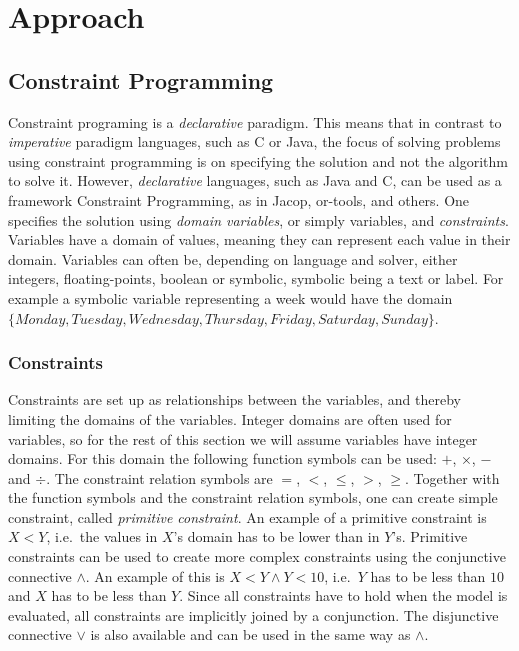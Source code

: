 \chapter{Approach}\label{cha:approach}

\section{Constraint Programming}
Constraint programing is a \emph{declarative} paradigm. This means that in contrast to \emph{imperative} paradigm languages, such as C or Java, the focus of solving problems using constraint programming is on specifying the solution and not the algorithm to solve it. However, \emph{declarative} languages, such as Java and C, can be used as a framework Constraint Programming, as in Jacop, or-tools, and others. One specifies the solution using \emph{domain variables}, or simply variables, and \emph{constraints}. Variables have a domain of values, meaning they can represent each value in their domain. Variables can often be, depending on language and solver, either integers, floating-points, boolean or symbolic, symbolic being a text or label. For example a symbolic variable representing a week would have the domain\\
$\{Monday,Tuesday, Wednesday, Thursday, Friday, Saturday, Sunday\}$.

\subsection{Constraints}
Constraints are set up as relationships between the variables, and thereby limiting the domains of the variables. Integer domains are often used for variables, so for the rest of this section we will assume variables have integer domains. For this domain the following function symbols can be used: $+$, $\times$, $-$ and $\div$. The constraint relation symbols are $=$, $<$, $\leq$, $>$, $\geq$. Together with the function symbols and the constraint relation symbols, one can create simple constraint, called \emph{primitive constraint}. An example of a primitive constraint is $X < Y$, i.e.\ the values in $X$'s domain has to be lower than in $Y$'s. Primitive constraints can be used to create more complex constraints using the conjunctive connective $\land$. An example of this is $X < Y \land Y < 10$, i.e.\ $Y$ has to be less than $10$ and $X$ has to be less than $Y$. Since all constraints have to hold when the model is evaluated, all constraints are implicitly joined by a conjunction. The disjunctive connective $\lor$ is also available and can be used in the same way as $\land$. 

